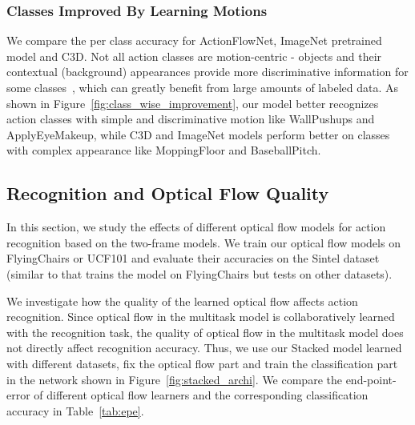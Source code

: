 \documentclass[10pt,twocolumn,letterpaper]{article}
\begin{document}
\subsubsection{Classes Improved By Learning Motions}
\vspace{-.5em}
We compare the per class accuracy for ActionFlowNet, ImageNet pretrained model and C3D.
Not all action classes are motion-centric - objects and their contextual (background) appearances provide more discriminative information for some classes~\cite{jain2015what}, which can greatly benefit from large amounts of labeled data.
As shown in Figure~\ref{fig:class_wise_improvement}, our model better recognizes action classes with simple and discriminative motion like WallPushups and ApplyEyeMakeup, while C3D and ImageNet models perform better on classes with complex appearance like MoppingFloor and BaseballPitch.






\subsection{Recognition and Optical Flow Quality}
\label{sec:estimate_of}
\vspace{-.5em}

In this section, we study the effects of different optical flow models for action recognition based on the two-frame models. We train our optical flow models on FlyingChairs or UCF101 and evaluate their accuracies on the Sintel dataset (similar to \cite{FischerDIHHGSCB15} that trains the model on FlyingChairs but tests on other datasets).


We investigate how the quality of the learned optical flow affects action recognition.
Since optical flow in the multitask model is collaboratively learned with the recognition task, the quality of optical flow in the multitask model does not directly affect recognition accuracy.
Thus, we use our Stacked model learned with different datasets, fix the optical flow part and train the classification part in the network shown in Figure~\ref{fig:stacked_archi}.
We compare the end-point-error of different optical flow learners and the corresponding classification accuracy in Table~\ref{tab:epe}.
\end{document}
